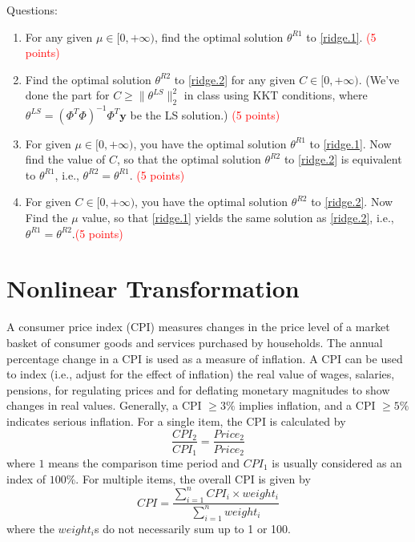 \documentclass[11pt, nocap, fleqn,a4paper,twoside]{article}
\newcommand{\by}{\mathbf{y}}
\newcommand{\benu}{\begin{enumerate}}
\newcommand{\eenu}{\end{enumerate}}
\begin{document}
Questions:

\benu
\item For any given $\mu\in[0,+\infty)$, find the optimal solution $\theta^{R1}$ to \eqref{ridge.1}. \textcolor{red}{(5 points)}
\item Find the optimal solution $\theta^{R2}$ to \eqref{ridge.2} for  any given $C\in[0,+\infty)$. (We've done the part for $C\ge \|\theta^{LS}\|_2^2$ in class using KKT conditions, where $\theta^{LS}  = (\Phi^T\Phi)^{-1}\Phi^T\by$ be the LS solution.) \textcolor{red}{(5 points)}
\item For given $\mu\in[0,+\infty)$, you have the optimal solution $\theta^{R1}$ to \eqref{ridge.1}.  Now find the value of $C$, so that the optimal solution $\theta^{R2}$ to \eqref{ridge.2} is equivalent to $\theta^{R1}$, i.e.,
$\theta^{R2} = \theta^{R1}$. \textcolor{red}{(5 points)}
\item For given $C\in[0,+\infty)$, you have the optimal solution $\theta^{R2}$ to \eqref{ridge.2}.  Now Find the $\mu$ value, so that \eqref{ridge.1} yields the same solution as \eqref{ridge.2}, i.e., $\theta^{R1} = \theta^{R2}$.\textcolor{red}{(5 points)}
\eenu

\section{Nonlinear Transformation}

A consumer price index (CPI) measures changes in the price level of a market basket of consumer goods and services purchased by households. The annual percentage change in a CPI is used as a measure of inflation. A CPI can be used to index (i.e., adjust for the effect of inflation) the real value of wages, salaries, pensions, for regulating prices and for deflating monetary magnitudes to show changes in real values.  Generally,  a CPI $\ge 3\% $ implies inflation, and a CPI $\ge 5\%$ indicates serious inflation.   For a single item, the CPI is calculated
by
\[  \frac{CPI_2}{CPI_1} = \frac{Price_2}{Price_2} \]
where $1$ means the comparison time period and $CPI_1$ is usually considered as an index of $100\%$.  For multiple items, the overall
CPI is given by
\[ CPI = \frac{\sum_{i=1}^n CPI_i \times weight_i}{\sum_{i=1}^n weight_i} \]
where the $weight_i$s do not necessarily sum up to 1 or 100.
\end{document}
